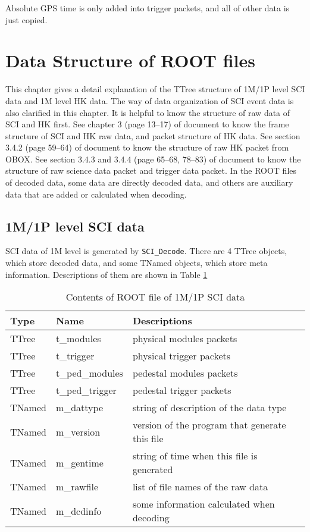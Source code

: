 \documentclass[a4paper, 12pt, onecolumn]{article}
\begin{document}
Absolute GPS time is only added into trigger packets, and all of other data is just copied.

\section{Data Structure of ROOT files}
This chapter gives a detail explanation of the TTree structure of 1M/1P level SCI data and 1M level HK data.
The way of data organization of SCI event data is also clarified in this chapter.
It is helpful to know the structure of raw data of SCI and HK first.
See chapter 3 (page 13--17) of document\cite{POLAR-data-link} to know the frame structure of SCI and HK raw data, and packet structure of HK data.
See section 3.4.2 (page 59--64) of document\cite{POLAR-OBOX-software}  to know the structure of raw HK packet from OBOX.
See section 3.4.3 and 3.4.4 (page 65--68, 78--83) of document\cite{POLAR-OBOX-software} to know the structure of raw science data packet and trigger data packet.
In the ROOT files of decoded data, some data are directly decoded data, and others are auxiliary data that are added or calculated when decoding.

\subsection{1M/1P level SCI data}
SCI data of 1M level is generated by \texttt{SCI\_Decode}.
There are 4 TTree objects, which store decoded data, and some TNamed objects, which store meta information.
Descriptions of them are shown in Table \ref{tab:1m-sci}

\begin{table}[htbp]
  \centering
  \caption{Contents of ROOT file of 1M/1P SCI data}\label{tab:1m-sci}
  \begin{tabular}{| l | l | l |}\hline
    \textbf{Type}    & \textbf{Name}    & \textbf{Descriptions}      \\\hline
    TTree            & t\_modules       & physical modules packets   \\\hline
    TTree            & t\_trigger       & physical trigger packets   \\\hline
    TTree            & t\_ped\_modules  & pedestal modules packets   \\\hline
    TTree            & t\_ped\_trigger  & pedestal trigger packets   \\\hline
    TNamed           & m\_dattype       & string of description of the data type   \\\hline
    TNamed           & m\_version       & version of the program that generate this file  \\\hline
    TNamed           & m\_gentime       & string of time when this file is generated \\\hline
    TNamed           & m\_rawfile       & list of file names of the raw data  \\\hline
    TNamed           & m\_dcdinfo       & some information calculated when decoding \\\hline
  \end{tabular}
\end{table}
\end{document}
